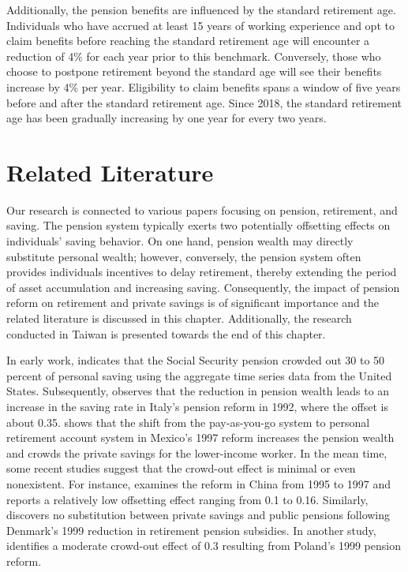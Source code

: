 \documentclass[12pt]{article}
\begin{document}
\begin{CJK*}{UTF8}{bsmi}
Additionally, the pension benefits are influenced by the 
standard retirement age. Individuals who have accrued at 
least 15 years of working experience and opt to claim 
benefits before reaching the standard retirement age will 
encounter a reduction of 4\% for each year prior to this 
benchmark. Conversely, those who choose to postpone 
retirement beyond the standard age will see their benefits 
increase by 4\% per year. Eligibility to claim benefits 
spans a window of five years before and after the standard 
retirement age. Since 2018, the standard retirement age has 
been gradually increasing by one year for every two years.

\section{Related Literature}

Our research is connected to various papers focusing on 
pension, retirement, and saving. The pension system typically 
exerts two potentially offsetting effects on individuals' 
saving behavior. On one hand, pension wealth may directly 
substitute personal wealth; however, conversely, the pension 
system often provides individuals incentives to delay 
retirement, thereby extending the period of asset 
accumulation and increasing saving. Consequently, the impact 
of pension reform on retirement and private savings is of 
significant importance and the related literature is 
discussed in this chapter. Additionally, the research 
conducted in Taiwan is presented towards the end of this 
chapter.

In early work, \cite{feldstein1974} indicates that the Social 
Security pension crowded out 30 to 50 percent of personal 
saving using the aggregate time series data from the United 
States. Subsequently, \cite{attanasio2003} observes that the 
reduction in pension wealth leads to an increase in the 
saving rate in Italy's pension reform in 1992, where the 
offset is about 0.35. \cite{aguila2011} shows that the shift 
from the pay-as-you-go system to personal retirement account 
system in Mexico's 1997 reform increases the pension wealth 
and crowds the private savings for the lower-income worker. 
In the mean time, some recent studies suggest that the 
crowd-out effect is minimal or even nonexistent. For 
instance, \cite{feng2011} examines the reform in China from 
1995 to 1997 and reports a relatively low offsetting effect 
ranging from 0.1 to 0.16. Similarly, \cite{chetty2014} 
discovers no substitution between private savings and public 
pensions following Denmark's 1999 reduction in retirement 
pension subsidies. In another study, \cite{lacowska2018} 
identifies a moderate crowd-out effect of 0.3 resulting from 
Poland's 1999 pension reform. 


\end{CJK*}
\end{document}
